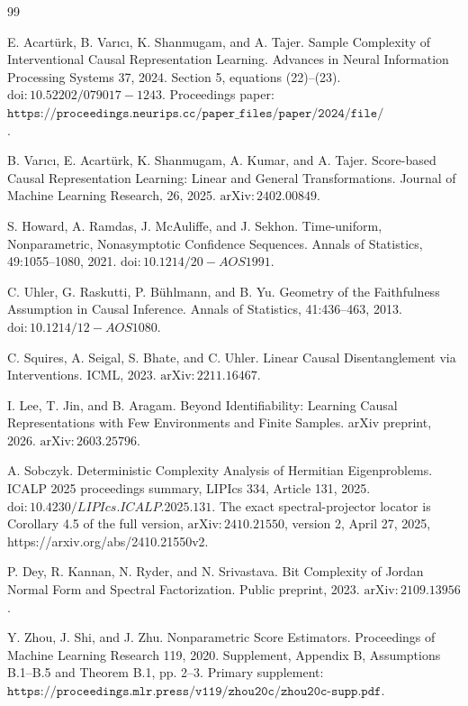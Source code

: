 \documentclass{article}
\begin{document}
\begin{thebibliography}{99}

   E. Acartürk, B. Varıcı, K. Shanmugam, and A. Tajer. Sample Complexity of Interventional Causal Representation Learning. Advances in Neural Information Processing Systems 37, 2024. Section 5, equations (22)--(23). \(\mathrm{doi}:10.52202/079017-1243\). Proceedings paper: \(\texttt{https://proceedings.neurips.cc/paper\_files/paper/2024/file/458fa8ee331566383d8e74bdb647f829-Paper-Conference.pdf}\).

   B. Varıcı, E. Acartürk, K. Shanmugam, A. Kumar, and A. Tajer. Score-based Causal Representation Learning: Linear and General Transformations. Journal of Machine Learning Research, 26, 2025. \(\text{arXiv}:2402.00849\).

   S. Howard, A. Ramdas, J. McAuliffe, and J. Sekhon. Time-uniform, Nonparametric, Nonasymptotic Confidence Sequences. Annals of Statistics, 49:1055--1080, 2021. \(\mathrm{doi}:10.1214/20-AOS1991\).

   C. Uhler, G. Raskutti, P. Bühlmann, and B. Yu. Geometry of the Faithfulness Assumption in Causal Inference. Annals of Statistics, 41:436--463, 2013. \(\mathrm{doi}:10.1214/12-AOS1080\).

   C. Squires, A. Seigal, S. Bhate, and C. Uhler. Linear Causal Disentanglement via Interventions. ICML, 2023. \(\text{arXiv}:2211.16467\).

   I. Lee, T. Jin, and B. Aragam. Beyond Identifiability: Learning Causal Representations with Few Environments and Finite Samples. arXiv preprint, 2026. \(\text{arXiv}:2603.25796\).

   A. Sobczyk. Deterministic Complexity Analysis of Hermitian Eigenproblems. ICALP 2025 proceedings summary, LIPIcs 334, Article 131, 2025. \(\mathrm{doi}:10.4230/LIPIcs.ICALP.2025.131\). The exact spectral-projector locator is Corollary 4.5 of the full version, \(\text{arXiv}:2410.21550\), version 2, April 27, 2025, https://arxiv.org/abs/2410.21550v2.

   P. Dey, R. Kannan, N. Ryder, and N. Srivastava. Bit Complexity of Jordan Normal Form and Spectral Factorization. Public preprint, 2023. \(\text{arXiv}:2109.13956\).

   Y. Zhou, J. Shi, and J. Zhu. Nonparametric Score Estimators. Proceedings of Machine Learning Research 119, 2020. Supplement, Appendix B, Assumptions B.1--B.5 and Theorem B.1, pp. 2--3. Primary supplement: \(\texttt{https://proceedings.mlr.press/v119/zhou20c/zhou20c-supp.pdf}\).


\end{thebibliography}
\end{document}
